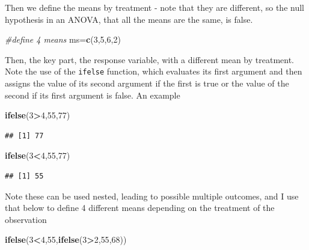 \documentclass[
]{book}
\newenvironment{Shaded}{\begin{snugshade}}{\end{snugshade}}
\newcommand{\CommentTok}[1]{\textcolor[rgb]{0.56,0.35,0.01}{\textit{#1}}}
\newcommand{\DecValTok}[1]{\textcolor[rgb]{0.00,0.00,0.81}{#1}}
\newcommand{\KeywordTok}[1]{\textcolor[rgb]{0.13,0.29,0.53}{\textbf{#1}}}
\newcommand{\NormalTok}[1]{#1}
\newcommand{\OperatorTok}[1]{\textcolor[rgb]{0.81,0.36,0.00}{\textbf{#1}}}
\begin{document}
Then we define the means by treatment - note that they are different, so the null hypothesis in an ANOVA, that all the means are the same, is false.

\begin{Shaded}
\begin{Highlighting}[]
\CommentTok{#define 4 means}
\NormalTok{ms=}\KeywordTok{c}\NormalTok{(}\DecValTok{3}\NormalTok{,}\DecValTok{5}\NormalTok{,}\DecValTok{6}\NormalTok{,}\DecValTok{2}\NormalTok{)}
\end{Highlighting}
\end{Shaded}

Then, the key part, the response variable, with a different mean by treatment. Note the use of the \texttt{ifelse} function, which evaluates its first argument and then assigns the value of its second argument if the first is true or the value of the second if its first argument is false. An example

\begin{Shaded}
\begin{Highlighting}[]
\KeywordTok{ifelse}\NormalTok{(}\DecValTok{3}\OperatorTok{>}\DecValTok{4}\NormalTok{,}\DecValTok{55}\NormalTok{,}\DecValTok{77}\NormalTok{)}
\end{Highlighting}
\end{Shaded}

\begin{verbatim}
## [1] 77
\end{verbatim}

\begin{Shaded}
\begin{Highlighting}[]
\KeywordTok{ifelse}\NormalTok{(}\DecValTok{3}\OperatorTok{<}\DecValTok{4}\NormalTok{,}\DecValTok{55}\NormalTok{,}\DecValTok{77}\NormalTok{)}
\end{Highlighting}
\end{Shaded}

\begin{verbatim}
## [1] 55
\end{verbatim}

Note these can be used nested, leading to possible multiple outcomes, and I use that below to define 4 different means depending on the treatment of the observation

\begin{Shaded}
\begin{Highlighting}[]
\KeywordTok{ifelse}\NormalTok{(}\DecValTok{3}\OperatorTok{<}\DecValTok{4}\NormalTok{,}\DecValTok{55}\NormalTok{,}\KeywordTok{ifelse}\NormalTok{(}\DecValTok{3}\OperatorTok{>}\DecValTok{2}\NormalTok{,}\DecValTok{55}\NormalTok{,}\DecValTok{68}\NormalTok{))}
\end{Highlighting}
\end{Shaded}
\end{document}
